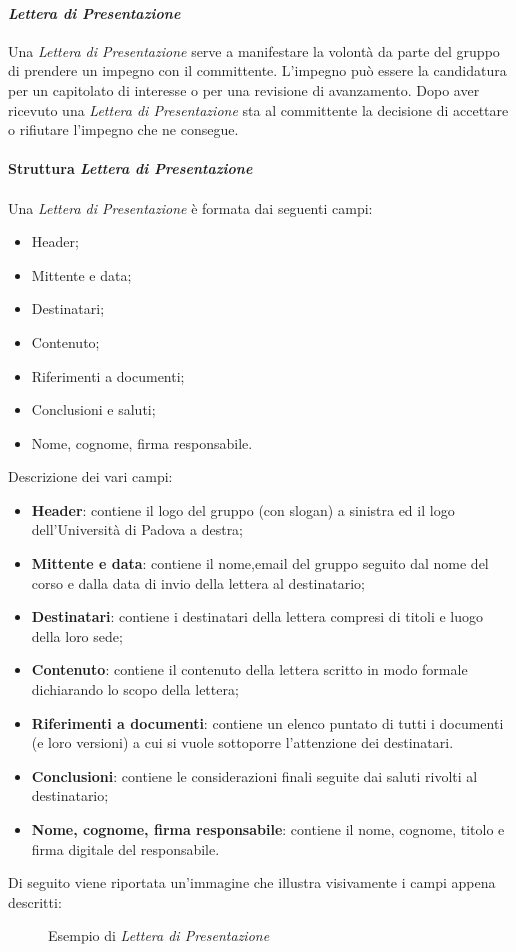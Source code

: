 \paragraph{\textit{Lettera di Presentazione}}
Una \textit{Lettera di Presentazione} serve a manifestare la volontà da parte del gruppo di prendere un impegno con il committente.
L'impegno può essere la candidatura per un capitolato di interesse o per una revisione di avanzamento.
Dopo aver ricevuto una \textit{Lettera di Presentazione} sta al committente la decisione di accettare o rifiutare l'impegno che ne consegue.
\\\\
\textbf{Struttura \textit{Lettera di Presentazione}}
\\\\
Una \textit{\textit{Lettera di Presentazione}} è formata dai seguenti campi:
\begin{itemize}
    \item Header;
    \item Mittente e data;
    \item Destinatari;
    \item Contenuto;
    \item Riferimenti a documenti;
    \item Conclusioni e saluti;
    \item Nome, cognome, firma responsabile.
\end{itemize}

\noindent Descrizione dei vari campi:
\begin{itemize}
\item \textbf{Header}: contiene il logo del gruppo (con slogan) a sinistra ed il logo dell'Università di Padova a destra;
\item \textbf{Mittente e data}: contiene il nome,email del gruppo seguito dal nome del corso e dalla data di invio della lettera al destinatario;
\item \textbf{Destinatari}: contiene i destinatari della lettera compresi di titoli e luogo della loro sede;
\item \textbf{Contenuto}: contiene il contenuto della lettera scritto in modo formale dichiarando lo scopo della lettera;
\item \textbf{Riferimenti a documenti}: contiene un elenco puntato di tutti i documenti (e loro versioni) a cui si vuole sottoporre l'attenzione dei destinatari. 
\item \textbf{Conclusioni}: contiene le considerazioni finali seguite dai saluti rivolti al destinatario;
\item \textbf{Nome, cognome, firma responsabile}: contiene il nome, cognome, titolo e firma digitale del responsabile.
\end{itemize}
Di seguito viene riportata un'immagine che illustra visivamente i campi appena descritti:
\begin{figure}[htbp]
    \centering
    \caption{Esempio di \textit{Lettera di Presentazione}}
\end{figure}
\pagebreak